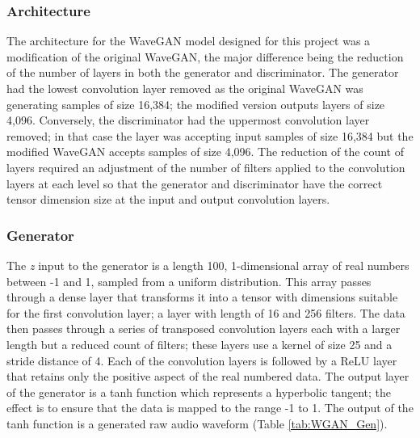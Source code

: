 \documentclass[a4paper, titlepage]{article}
\begin{document}
\subsubsection{Architecture}

The architecture for the WaveGAN model designed for this project was a modification of the original WaveGAN, the major difference being the reduction of the number of layers in both the generator and discriminator.
\newline
\newline
The generator had the lowest convolution layer removed as the original WaveGAN was generating samples of size 16,384; the modified version outputs layers of size 4,096.
Conversely, the discriminator had the uppermost convolution layer removed; in that case the layer was accepting input samples of size 16,384 but the modified WaveGAN accepts samples of size 4,096.
\newline
\newline
The reduction of the count of layers required an adjustment of the number of filters applied to the convolution layers at each level so that the generator and discriminator have the correct tensor dimension size at the input and output convolution layers.

\subsubsection{Generator}

The \textit{z} input to the generator is a length 100, 1-dimensional array of real numbers between -1 and 1, sampled from a uniform distribution.
This array passes through a dense layer that transforms it into a tensor with dimensions suitable for the first convolution layer; a layer with length of 16 and 256 filters.
\newline
\newline
The data then passes through a series of transposed convolution layers each with a larger length but a reduced count of filters; these layers use a kernel of size 25 and a stride distance of 4.
Each of the convolution layers is followed by a ReLU layer that retains only the positive aspect of the real numbered data.
\newline
\newline
The output layer of the generator is a tanh function which represents a hyperbolic tangent; the effect is to ensure that the data is mapped to the range -1 to 1.
The output of the tanh function is a generated raw audio waveform (Table \ref{tab:WGAN_Gen}).
\end{document}
